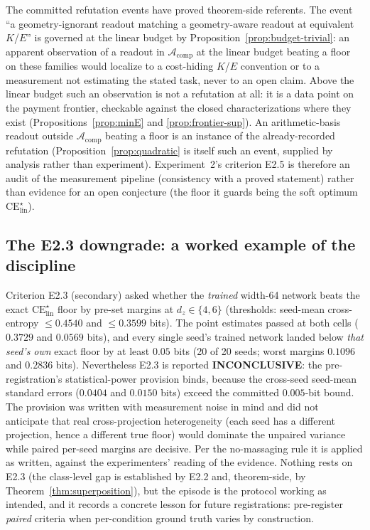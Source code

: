 \documentclass[twocolumn,10pt]{article}
\theoremstyle{definition}
\theoremstyle{remark}
\newcommand{\cA}{\mathcal{A}}
\newcommand{\dz}{d_z}
\newcommand{\CE}{\mathrm{CE}}
\begin{document}
The committed refutation events have proved theorem-side referents.
The event ``a geometry-ignorant readout matching a geometry-aware
readout at equivalent $K$/$E$'' is governed at the linear budget by
Proposition~\ref{prop:budget-trivial}: an apparent observation of a
readout in $\cA_{\mathrm{comp}}$ at the linear budget beating a floor
on these families would localize to a cost-hiding $K$/$E$ convention
or to a measurement not estimating the stated task, never to an
open claim. Above the linear budget such an observation is not a
refutation at all: it is a data point on the payment frontier,
checkable against the closed characterizations where they exist
(Propositions~\ref{prop:minE} and \ref{prop:frontier-sup}). An
arithmetic-basis readout outside $\cA_{\mathrm{comp}}$ beating a floor
is an instance of the already-recorded refutation
(Proposition~\ref{prop:quadratic} is itself such an event, supplied by
analysis rather than experiment). Experiment~2's criterion E2.5 is
therefore an audit of the measurement pipeline (consistency with a
proved statement) rather than evidence for an open conjecture (the
floor it guards being the soft optimum $\CE^{\star}_{\mathrm{lin}}$).

\subsection{The E2.3 downgrade: a worked example of the discipline}
\label{app:protocol-e23}

Criterion E2.3 (secondary) asked whether the \emph{trained} width-64
network beats the exact $\CE^{\star}_{\mathrm{lin}}$ floor by pre-set
margins at $\dz \in \{4, 6\}$ (thresholds: seed-mean cross-entropy
$\le 0.4540$ and $\le 0.3599$ bits). The point estimates passed at
both cells ($0.3729$ and $0.0569$ bits), and every single seed's
trained network landed below \emph{that seed's own} exact floor by at
least $0.05$ bits (20 of 20 seeds; worst margins $0.1096$ and $0.2836$
bits). Nevertheless E2.3 is reported \textbf{INCONCLUSIVE}: the
pre-registration's statistical-power provision binds, because the
cross-seed seed-mean standard errors ($0.0404$ and $0.0150$ bits)
exceed the committed $0.005$-bit bound. The provision was written with
measurement noise in mind and did not anticipate that real
cross-projection heterogeneity (each seed has a different projection,
hence a different true floor) would dominate the unpaired variance
while paired per-seed margins are decisive. Per the no-massaging rule
it is applied as written, against the experimenters' reading of the
evidence. Nothing rests on E2.3 (the class-level gap is established
by E2.2 and, theorem-side, by Theorem~\ref{thm:superposition}), but
the episode is the protocol working as intended, and it records a
concrete lesson for future registrations: pre-register \emph{paired}
criteria when per-condition ground truth varies by construction.
\end{document}
